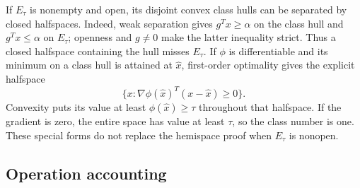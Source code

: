 If $E_\tau$ is nonempty and open, its disjoint convex class hulls can be
separated by closed halfspaces. Indeed, weak separation gives
$g^Tx\ge\alpha$ on the class hull and $g^Tx\le\alpha$ on $E_\tau$;
openness and $g\ne0$ make the latter inequality strict. Thus a closed
halfspace containing the hull misses $E_\tau$. If $\phi$ is differentiable
and its minimum on a class hull is attained at $\widehat x$, first-order
optimality gives the explicit halfspace
\begin{equation*}
 \{x:\nabla\phi(\widehat x)^T(x-\widehat x)\ge0\}.
\end{equation*}
Convexity puts its value at least $\phi(\widehat x)\ge\tau$ throughout
that halfspace. If the gradient is zero, the entire space has value at
least $\tau$, so the class number is one. These special forms do not
replace the hemispace proof when $E_\tau$ is nonopen.

\subsection{Operation accounting}
\label{app:lattice:operations}

